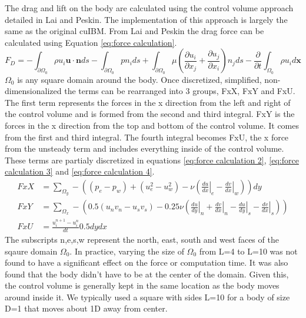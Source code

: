 \documentclass[onehalf,11pt]{beavtex}
\begin{document}
The drag and lift on the body are calculated using the control volume approach detailed in Lai and Peskin\cite{lai2000immersed}.
The implementation of this approach is largely the same as the original cuIBM.
From Lai and Peskin the drag force can be calculated using Equation \ref{eq:force calculation}.
\begin{equation}\label{eq:force calculation}
F_D=-\int_{\partial \Omega_0} \rho u_i\textbf{u}\cdot \textbf{n}ds- \int_{\partial \Omega_0}pn_ids+\int_{\partial \Omega_0}\mu \left(\frac{\partial u_i}{\partial x_j}+\frac{\partial u_j}{\partial x_i}\right)n_jds-\frac{\partial}{\partial t}\int_{\Omega_0}\rho u_i d\textbf{x}
\end{equation}
$\Omega_0$ is any square domain around the body.
Once discretized, simplified, non-dimensionalized the terms can be rearranged into 3 groups, FxX, FxY and FxU.
The first term represents the forces in the x direction from the left and right of the control volume and is formed from the second and third integral.
FxY is the forces in the x direction from the top and bottom of the control volume.
It comes from the first and third integral.
The fourth integral becomes FxU, the x force from the unsteady term and includes everything inside of the control volume.
These terms are partialy discretized in equations \eqref{eq:force calculation 2}, \eqref{eq:force calculation 3} and \eqref{eq:force calculation 4}. 
\begin{align}
FxX &=\sum_{\Omega_y}-\left((p_e-p_w)+(u_e^2-u_w^2)-\nu\left(\left.\frac{du}{dx}\right|_e-\left.\frac{dv}{dx}\right|_w\right)\right)dy\label{eq:force calculation 2}\\
FxY &=\sum_{\Omega_x}-\left(0.5(u_nv_n-u_sv_s)-0.25\nu \left(\left.\frac{du}{dy}\right|_n+\left.\frac{dv}{dx}\right|_n-\left.\frac{du}{dy}\right|_s-\left.\frac{dv}{dx}\right|_s\right)\right)\label{eq:force calculation 3}\\
FxU &=\frac{u_i^{n+1}-u_i^{n}}{dt}0.5dydx\;\label{eq:force calculation 4}
\end{align}
The subscripts n,e,s,w represent the north, east, south and west faces of the sqaure domain $\Omega_0$.
In practice, varying the size of $\Omega_0$ from L=4 to L=10 was not found to have a significant effect on the force or computation time.
It was also found that the body didn't have to be at the center of the domain.
Given this, the control volume is generally kept in the same location as the body moves around inside it.
We typically used a square with sides L=10 for a body of size D=1 that moves about 1D away from center.
\end{document}
